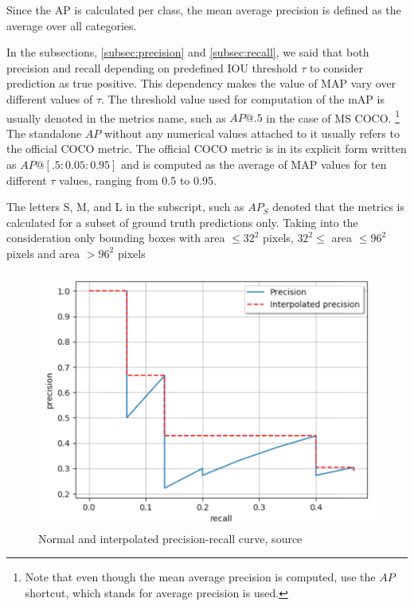 Since the AP is calculated per class, the mean average precision is defined as the average over all categories.

In the subsections, \ref{subsec:precision} and \ref{subsec:recall}, we said that both precision and recall depending on predefined IOU threshold $\tau$ to consider prediction as true positive. This dependency makes the value of MAP vary over different values of $\tau$. The threshold value used for computation of the mAP is usually denoted in the metrics name, such as $AP@.5$ in the case of MS COCO. \footnote{Note that even though the mean average precision is computed, use the $AP$ shortcut, which stands for average precision is used.} The standalone $AP$ without any numerical values attached to it usually refers to the official COCO metric. The official COCO metric is in its explicit form written as $AP@[.5:0.05:0.95]$ and is computed as the average of MAP values for ten different $\tau$ values, ranging from 0.5 to 0.95.

The letters S, M,  and L in the subscript, such as $AP_S$ denoted that the metrics is calculated for a subset of ground truth predictions only. Taking into the consideration only bounding boxes with area $\leq 32^2$ pixels, $32^2 \le $ area $ \leq 96^2$ pixels and area $> 96^2$ pixels

\begin{figure}
    \includegraphics[width = \linewidth]{images/PR-curve.png}
    \caption{Normal and interpolated precision-recall curve, source \cite{Padilla2020}}
    \label{fig:pr_curve}
\end{figure}



